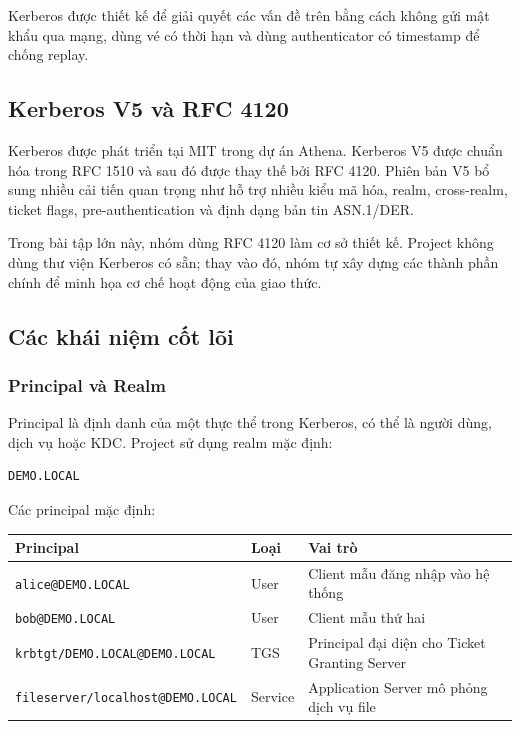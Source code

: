 \documentclass[12pt]{article}
\begin{document}
Kerberos được thiết kế để giải quyết các vấn đề trên bằng cách không gửi mật khẩu qua mạng, dùng vé có thời hạn và dùng authenticator có timestamp để chống replay.

\subsection{Kerberos V5 và RFC 4120}

Kerberos được phát triển tại MIT trong dự án Athena. Kerberos V5 được chuẩn hóa trong RFC 1510 và sau đó được thay thế bởi RFC 4120. Phiên bản V5 bổ sung nhiều cải tiến quan trọng như hỗ trợ nhiều kiểu mã hóa, realm, cross-realm, ticket flags, pre-authentication và định dạng bản tin ASN.1/DER.

Trong bài tập lớn này, nhóm dùng RFC 4120 làm cơ sở thiết kế. Project không dùng thư viện Kerberos có sẵn; thay vào đó, nhóm tự xây dựng các thành phần chính để minh họa cơ chế hoạt động của giao thức.

\subsection{Các khái niệm cốt lõi}

\subsubsection{Principal và Realm}

Principal là định danh của một thực thể trong Kerberos, có thể là người dùng, dịch vụ hoặc KDC. Project sử dụng realm mặc định:

\begin{lstlisting}[style=textcode]
DEMO.LOCAL
\end{lstlisting}

Các principal mặc định:

\begin{table}[H]
\centering
\renewcommand{\arraystretch}{1.3}
\begin{tabularx}{\textwidth}{|p{7cm}|p{3cm}|X|}
\hline
\textbf{Principal} & \textbf{Loại} & \textbf{Vai trò} \\
\hline
\texttt{alice@DEMO.LOCAL} & User & Client mẫu đăng nhập vào hệ thống \\
\hline
\texttt{bob@DEMO.LOCAL} & User & Client mẫu thứ hai \\
\hline
\texttt{krbtgt/DEMO.LOCAL@DEMO.LOCAL} & TGS & Principal đại diện cho Ticket Granting Server \\
\hline
\texttt{fileserver/localhost@DEMO.LOCAL} & Service & Application Server mô phỏng dịch vụ file \\
\hline
\end{tabularx}
\end{table}
\end{document}
